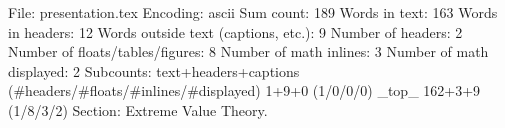 File: presentation.tex
Encoding: ascii
Sum count: 189
Words in text: 163
Words in headers: 12
Words outside text (captions, etc.): 9
Number of headers: 2
Number of floats/tables/figures: 8
Number of math inlines: 3
Number of math displayed: 2
Subcounts:
  text+headers+captions (#headers/#floats/#inlines/#displayed)
  1+9+0 (1/0/0/0) _top_
  162+3+9 (1/8/3/2) Section: Extreme Value Theory. 

